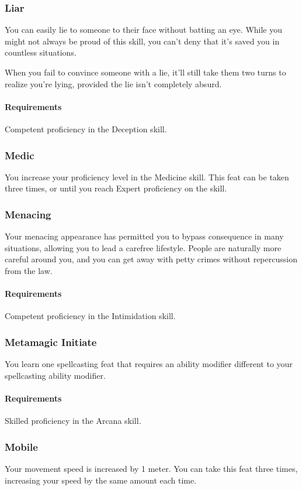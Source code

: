 \subsubsection{Liar} \label{feat::liar}
    You can easily lie to someone to their face without batting an eye.
    While you might not always be proud of this skill, you can't deny that it's saved you in countless situations.

    When you fail to convince someone with a lie, it'll still take them two turns to realize you're lying, provided the lie isn't completely absurd.
    \paragraph{Requirements} Competent proficiency in the Deception skill.
\subsubsection{Medic} \label{feat::medic}
    You increase your proficiency level in the Medicine skill.
    This feat can be taken three times, or until you reach Expert proficiency on the skill.
\subsubsection{Menacing} \label{feat::menacing}
    Your menacing appearance has permitted you to bypass consequence in many situations, allowing you to lead a carefree lifestyle.
    People are naturally more careful around you, and you can get away with petty crimes without repercussion from the law.
    \paragraph{Requirements} Competent proficiency in the Intimidation skill.
\subsubsection{Metamagic Initiate} \label{feat::metamagicinitiate}
    You learn one spellcasting feat that requires an ability modifier different to your spellcasting ability modifier.
    \paragraph{Requirements} Skilled proficiency in the Arcana skill.
\subsubsection{Mobile} \label{feat::mobile}
    Your movement speed is increased by 1 meter.
    You can take this feat three times, increasing your speed by the same amount each time.

